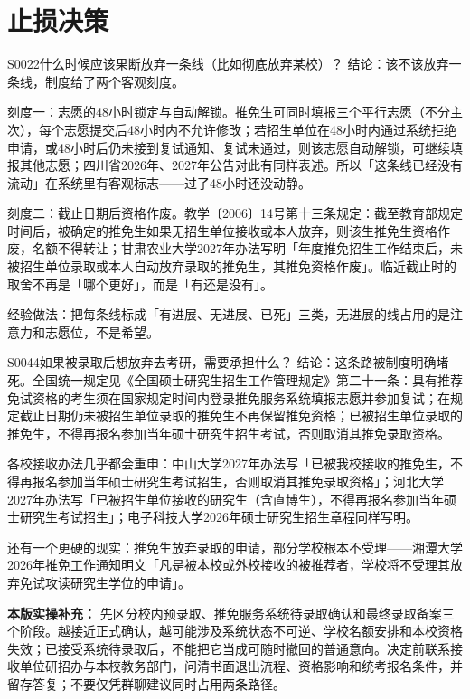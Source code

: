 \section{止损决策}
\begin{qa}{S0022}{什么时候应该果断放弃一条线（比如彻底放弃某校）？}
结论：该不该放弃一条线，制度给了两个客观刻度。

刻度一：志愿的48小时锁定与自动解锁。推免生可同时填报三个平行志愿（不分主次），每个志愿提交后48小时内不允许修改；若招生单位在48小时内通过系统拒绝申请，或48小时后仍未接到复试通知、复试未通过，则该志愿自动解锁，可继续填报其他志愿；四川省2026年、2027年公告对此有同样表述。所以「这条线已经没有流动」在系统里有客观标志——过了48小时还没动静。

刻度二：截止日期后资格作废。教学〔2006〕14号第十三条规定：截至教育部规定时间后，被确定的推免生如果无招生单位接收或本人放弃，则该生推免生资格作废，名额不得转让；甘肃农业大学2027年办法写明「年度推免招生工作结束后，未被招生单位录取或本人自动放弃录取的推免生，其推免资格作废」。临近截止时的取舍不再是「哪个更好」，而是「有还是没有」。

经验做法：把每条线标成「有进展、无进展、已死」三类，无进展的线占用的是注意力和志愿位，不是希望。
\end{qa}

\begin{qa}{S0044}{如果被录取后想放弃去考研，需要承担什么？}
结论：这条路被制度明确堵死。全国统一规定见《全国硕士研究生招生工作管理规定》第二十一条：具有推荐免试资格的考生须在国家规定时间内登录推免服务系统填报志愿并参加复试；在规定截止日期仍未被招生单位录取的推免生不再保留推免资格；已被招生单位录取的推免生，不得再报名参加当年硕士研究生招生考试，否则取消其推免录取资格。

各校接收办法几乎都会重申：中山大学2027年办法写「已被我校接收的推免生，不得再报名参加当年硕士研究生考试招生，否则取消其推免录取资格」；河北大学2027年办法写「已被招生单位接收的研究生（含直博生），不得再报名参加当年硕士研究生考试招生」；电子科技大学2026年硕士研究生招生章程同样写明。

还有一个更硬的现实：推免生放弃录取的申请，部分学校根本不受理——湘潭大学2026年推免工作通知明文「凡是被本校或外校接收的被推荐者，学校将不受理其放弃免试攻读研究生学位的申请」。
\par\textbf{本版实操补充：} 先区分校内预录取、推免服务系统待录取确认和最终录取备案三个阶段。越接近正式确认，越可能涉及系统状态不可逆、学校名额安排和本校资格失效；已接受系统待录取后，不能把它当成可随时撤回的普通意向。决定前联系接收单位研招办与本校教务部门，问清书面退出流程、资格影响和统考报名条件，并留存答复；不要仅凭群聊建议同时占用两条路径。
\end{qa}

